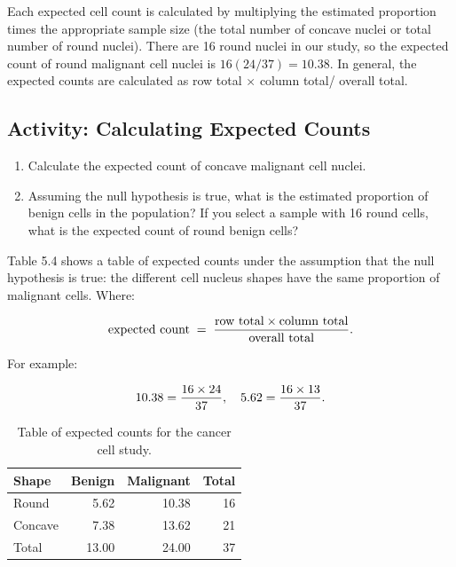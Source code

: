 \documentclass[
]{book}
\begin{document}
Each expected cell count is calculated by multiplying the estimated proportion times the
­appropriate sample size (the total number of concave nuclei or total number of round nuclei).
There are 16 round nuclei in our study, so the expected count of round malignant cell nuclei is
\(16(24/37)= 10.38\). In general, the expected counts are calculated as row total \(\times\) column total/
overall total.

\hypertarget{activity-calculating-expected-counts}{%
\subsection*{Activity: Calculating Expected Counts}\label{activity-calculating-expected-counts}}

\begin{enumerate}
\def\labelenumi{\arabic{enumi}.}
\setcounter{enumi}{16}
\item
  Calculate the expected count of concave malignant cell nuclei.
\item
  Assuming the null hypothesis is true, what is the estimated proportion of benign cells in the population? If you select a sample with 16 round cells, what is the expected count of round benign cells?
\end{enumerate}

Table 5.4 shows a table of expected counts under the assumption that the null hypothesis is true: the different cell nucleus shapes have the same proportion of malignant cells. Where:

\begin{align}
\text{expected count} \;=\; \frac{\text{row total} \times \text{column total}}{\text{overall total}}.
\notag
\end{align}

For example:

\begin{align}
10.38 = \frac{16 \times 24}{37}, \notag
\quad
5.62 = \frac{16 \times 13}{37}. \notag
\end{align}

\begin{table}

\caption{\label{tab:tab54}Table of expected counts for the cancer cell study.}
\centering
\begin{tabular}[t]{lrrr}
\toprule
Shape & Benign & Malignant & Total\\
\midrule
Round & 5.62 & 10.38 & 16\\
Concave & 7.38 & 13.62 & 21\\
Total & 13.00 & 24.00 & 37\\
\bottomrule
\end{tabular}
\end{table}
\end{document}
